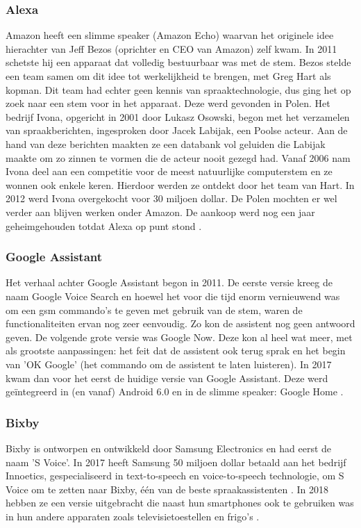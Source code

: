 \documentclass{hogent-article}
\begin{document}
\subsubsection{Alexa}
Amazon heeft een slimme speaker (Amazon Echo) waarvan het originele idee hierachter van Jeff Bezos (oprichter en CEO van Amazon) zelf kwam. In 2011 schetste hij een apparaat dat volledig bestuurbaar was met de stem. Bezos stelde een team samen om dit idee tot werkelijkheid te brengen, met Greg Hart als kopman. Dit team had echter geen kennis van spraaktechnologie, dus ging het op zoek naar een stem voor in het apparaat. Deze werd gevonden in Polen. Het bedrijf Ivona, opgericht in 2001 door Lukasz Osowski, begon met het verzamelen van spraakberichten, ingesproken door Jacek Labijak, een Poolse acteur. Aan de hand van deze berichten maakten ze een databank vol geluiden die Labijak maakte om zo zinnen te vormen die de acteur nooit gezegd had. Vanaf 2006 nam Ivona deel aan een competitie voor de meest natuurlijke computerstem en ze wonnen ook enkele keren. Hierdoor werden ze ontdekt door het team van Hart. In 2012 werd Ivona overgekocht voor 30 miljoen dollar. De Polen mochten er wel verder aan blijven werken onder Amazon. De aankoop werd nog een jaar geheimgehouden totdat Alexa op punt stond \autocite{Stone2021}.

\subsubsection{Google Assistant}
Het verhaal achter Google Assistant begon in 2011. De eerste versie kreeg de naam Google Voice Search en hoewel het voor die tijd enorm vernieuwend was om een gsm commando's te geven met gebruik van de stem, waren de functionaliteiten ervan nog zeer eenvoudig. Zo kon de assistent nog geen antwoord geven. De volgende grote versie was Google Now. Deze kon al heel wat meer, met als grootste aanpassingen: het feit dat de assistent ook terug sprak en het begin van 'OK Google' (het commando om de assistent te laten luisteren). In 2017 kwam dan voor het eerst de huidige versie van Google Assistant. Deze werd geïntegreerd in (en vanaf) Android 6.0 en in de slimme speaker: Google Home \autocite{Jansen2018}.

\subsubsection{Bixby}
Bixby is ontworpen en ontwikkeld door Samsung Electronics en had eerst de naam 'S Voice'. In 2017 heeft Samsung 50 miljoen dollar betaald aan het bedrijf Innoetics, gespecialiseerd in text-to-speech en voice-to-speech technologie, om S Voice om te zetten naar Bixby, één van de beste spraakassistenten \autocite{Reigh2017}. In 2018 hebben ze een versie uitgebracht die naast hun smartphones ook te gebruiken was in hun andere apparaten zoals televisietoestellen en frigo's \autocite{Wikipedia2022}.
\end{document}
